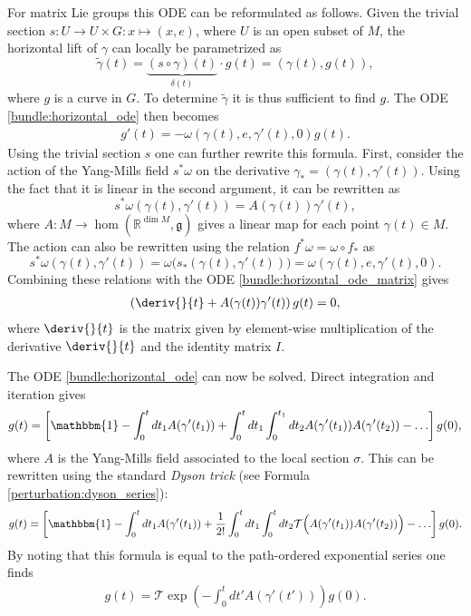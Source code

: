    \begin{example}
         For matrix Lie groups this ODE can be reformulated as follows. Given the trivial section $s:U\rightarrow U\times G:x\mapsto(x,e)$, where $U$ is an open subset of $M$, the horizontal lift of $\gamma$ can locally be parametrized as \[\widetilde{\gamma}(t) = \underbrace{(s\circ\gamma)(t)}_{\delta(t)}\cdot g(t) = (\gamma(t),g(t)),\] where $g$ is a curve in $G$. To determine $\widetilde{\gamma}$ it is thus sufficient to find $g$. The ODE \eqref{bundle:horizontal_ode} then becomes
        \begin{gather}
            \label{bundle:horizontal_ode_matrix}
            g'(t) = -\omega(\gamma(t),e,\gamma'(t),0)g(t).
        \end{gather}
        Using the trivial section $s$ one can further rewrite this formula. First, consider the action of the Yang-Mills field $s^*\omega$ on the derivative $\gamma_* = (\gamma(t),\gamma'(t))$. Using the fact that it is linear in the second argument, it can be rewritten as \[s^*\omega(\gamma(t),\gamma'(t)) = A(\gamma(t))\gamma'(t),\] where $A:M\rightarrow\hom(\mathbb{R}^{\dim M},\mathfrak{g})$ gives a linear map for each point $\gamma(t)\in M$. The action can also be rewritten using the relation $f^*\omega = \omega\circ f_\ast$ as \[s^*\omega(\gamma(t),\gamma'(t)) = \omega\Big(s_\ast(\gamma(t),\gamma'(t))\Big) = \omega(\gamma(t),e,\gamma'(t),0).\] Combining these relations with the ODE \eqref{bundle:horizontal_ode_matrix} gives
        \begin{gather}
            \label{bundle:horizontal_ode_derivative}
            \left(\deriv{}{t} + A(\gamma(t))\gamma'(t)\right)g(t) = 0,
        \end{gather}
        where $\deriv{}{t}$ is the matrix given by element-wise multiplication of the derivative $\deriv{}{t}$ and the identity matrix $I$.

        The ODE \eqref{bundle:horizontal_ode} can now be solved. Direct integration and iteration gives
        \begin{gather}
            g(t) = \left[\mathbbm{1} - \int_0^tdt_1A(\gamma'(t_1)) + \int_0^tdt_1\int_0^{t_1}dt_2A(\gamma'(t_1))A(\gamma'(t_2))-\ldots\right]g(0),
        \end{gather}
        where $A$ is the Yang-Mills field associated to the local section $\sigma$. This can be rewritten using the standard \textit{Dyson trick} (see Formula \ref{perturbation:dyson_series}):
        \begin{gather}
            g(t) = \left[\mathbbm{1} - \int_0^tdt_1A(\gamma'(t_1)) + \frac{1}{2!}\int_0^tdt_1\int_0^tdt_2\mathcal{T}\Big(A(\gamma'(t_1))A(\gamma'(t_2))\Big)-\ldots\right]g(0).
        \end{gather}
        By noting that this formula is equal to the path-ordered exponential series one finds
        \begin{gather}
            \label{bundle:g0_to_gt}
            g(t) = \mathcal{T}\exp\left(-\int_0^tdt'A(\gamma'(t'))\right)g(0).
        \end{gather}
    \end{example}


